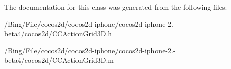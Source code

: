 The documentation for this class was generated from the following files\-:\begin{DoxyCompactItemize}
\item 
/\-Bing/\-File/cocos2d/cocos2d-\/iphone/cocos2d-\/iphone-\/2.-\/beta4/cocos2d/C\-C\-Action\-Grid3\-D.\-h\item 
/\-Bing/\-File/cocos2d/cocos2d-\/iphone/cocos2d-\/iphone-\/2.-\/beta4/cocos2d/C\-C\-Action\-Grid3\-D.\-m\end{DoxyCompactItemize}
